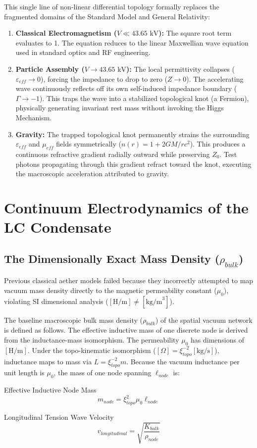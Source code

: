 This single line of non-linear differential topology formally replaces the fragmented domains of the Standard Model and General Relativity:
\begin{enumerate}
    \item \textbf{Classical Electromagnetism ($V \ll 43.65\text{ kV}$):} The square root term evaluates to 1. The equation reduces to the linear Maxwellian wave equation used in standard optics and RF engineering.
    \item \textbf{Particle Assembly ($V \to 43.65\text{ kV}$):} The local permittivity collapses ($\varepsilon_{eff} \to 0$), forcing the impedance to drop to zero ($Z \to 0$). The accelerating wave continuously reflects off its own self-induced impedance boundary ($\Gamma \to -1$). This traps the wave into a stabilized topological knot (a Fermion), physically generating invariant rest mass without invoking the Higgs Mechanism.
    \item \textbf{Gravity:} The trapped topological knot permanently strains the surrounding $\varepsilon_{eff}$ and $\mu_{eff}$ fields symmetrically ($n(r) = 1 + 2GM/rc^2$). This produces a continuous refractive gradient radially outward while preserving $Z_0$. Test photons propagating through this gradient refract toward the knot, executing the macroscopic acceleration attributed to gravity.
\end{enumerate}

\section{Continuum Electrodynamics of the LC Condensate}
\subsection{The Dimensionally Exact Mass Density ($\rho_{bulk}$)}
Previous classical aether models failed because they incorrectly attempted to map vacuum mass density directly to the magnetic permeability constant ($\mu_0$), violating SI dimensional analysis ($[\text{H/m}] \neq [\text{kg/m}^3]$).

The baseline macroscopic bulk mass density ($\rho_{bulk}$) of the spatial vacuum network is defined as follows. The effective inductive mass of one discrete node is derived from the inductance-mass isomorphism. The permeability $\mu_0$ has dimensions of $[\text{H/m}]$. Under the topo-kinematic isomorphism ($[\Omega] = \xi_{topo}^{-2}[\text{kg/s}]$), inductance maps to mass via $L = \xi_{topo}^{-2} m$. Because the vacuum inductance per unit length is $\mu_0$, the mass of one node spanning $\ell_{node}$ is:
\begin{resultbox}{Effective Inductive Node Mass}
\begin{equation}
    m_{node} = \xi_{topo}^2 \mu_0 \ell_{node}
\end{equation}
\end{resultbox}
\begin{resultbox}{Longitudinal Tension Wave Velocity}
\begin{equation}
    v_{longitudinal} = \sqrt{\frac{K_{bulk}}{\rho_{node}}}
\end{equation}
\end{resultbox}

